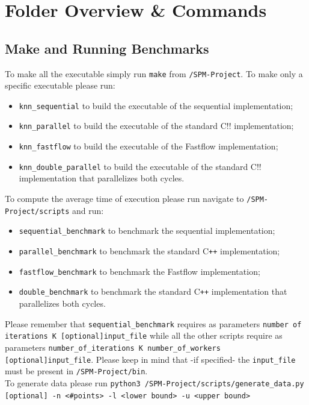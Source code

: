 \documentclass[12pt, letterpaper]{article}  %
\begin{document}
\section{Folder Overview \& Commands}
\subsection{Make and Running Benchmarks}
To make all the executable simply run \texttt{make} from \texttt{/SPM-Project}. To make only a specific executable please run:
\begin{itemize}
    \item \texttt{knn\_sequential} to build the executable of the sequential implementation;
    \item \texttt{knn\_parallel} to build the executable of the standard C!\verb++! implementation;
    \item \texttt{knn\_fastflow} to build the executable of the Fastflow implementation;
    \item \texttt{knn\_double\_parallel} to build the executable of the standard C!\verb++! implementation that parallelizes both cycles.
\end{itemize}
To compute the average time of execution please run navigate to \texttt{/SPM-Project/scripts} and run:
\begin{itemize}
    \item \texttt{sequential\_benchmark} to benchmark the sequential implementation;
    \item \texttt{parallel\_benchmark} to benchmark the standard C\verb!++! implementation;
    \item \texttt{fastflow\_benchmark} to benchmark the Fastflow implementation;
    \item \texttt{double\_benchmark} to benchmark the standard C\verb!++! implementation that parallelizes both cycles.
\end{itemize}
Please remember that \texttt{sequential\_benchmark} requires as parameters \texttt{number of iterations K [optional]input\_file} while all the other scripts require as parameters \texttt{number\_of\_iterations K number\_of\_workers [optional]input\_file}. Please keep in mind that -if specified- the \texttt{input\_file} must be present in \texttt{/SPM-Project/bin}.\\
To generate data please run \texttt{python3 /SPM-Project/scripts/generate\_data.py [optional] -n <\#points> -l <lower bound> -u <upper bound>}
\end{document}
